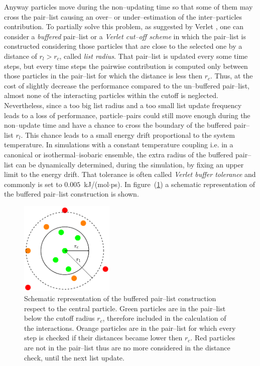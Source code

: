 Anyway particles move during the non--updating time so that some of them may cross the pair--list causing an over-- or under--estimation of the inter--particles contribution. To partially solve this problem, as suggested by Verlet \cite{VerletList}, one can consider a \textit{buffered} pair--list or a \textit{Verlet cut--off scheme} in which the pair--list is constructed considering those particles that are close to the selected one by a distance of $r_l > r_c$, called \textit{list radius}. That pair--list is updated every some time steps, but every time steps the
pairwise contribution is computed only between those particles in the pair--list for which the distance is less then $r_c$. Thus, at the cost of slightly decrease the performance compared to the un--buffered pair--list, almost none of the interacting particles within the cutoff is neglected. Nevertheless, since a too big list radius and a too small list update frequency leads to a loss of performance, particle--pairs could still move enough during the non--update
time and have a chance to cross the boundary of the buffered pair--list $r_l$. This chance leads to a small energy drift proportional to the system temperature. In simulations with a constant temperature coupling i.e. in a canonical or isothermal--isobaric ensemble, the extra radius of the buffered pair--list can be dynamically determined, during the simulation, by fixing an upper limit to the energy drift. That tolerance is often called \textit{Verlet buffer tolerance} and commonly is set to $0.005$~kJ/(mol$\cdot$ps). In figure~(\ref{fig:pairlist}) a schematic representation of the buffered pair--list construction is shown.
\begin{figure}
	\includegraphics[width=0.4\textwidth]{./img/pairList/pairList}
	\caption{Schematic representation of the buffered pair--list construction respect to the central particle.
	Green particles are in the pair--list below the cutoff radius $r_c$, therefore included in the calculation of the interactions. Orange particles are in the pair--list for which every step is checked if their distances became lower then $r_c$. Red particles are not in the pair--list thus are no more considered in the distance check, until the next list update.}
	\label{fig:pairlist}
\end{figure}

